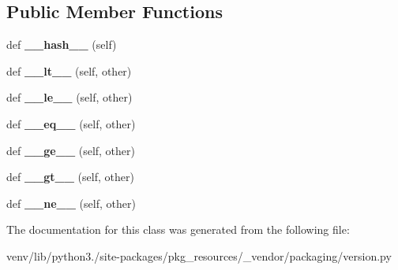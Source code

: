 \subsection*{Public Member Functions}
\begin{DoxyCompactItemize}
\item 
\mbox{\label{classpkg__resources_1_1__vendor_1_1packaging_1_1version_1_1___base_version_a12e90ca37b8bdb6cb0e76418fe1cd2d5}} 
def {\bfseries \+\_\+\+\_\+hash\+\_\+\+\_\+} (self)
\item 
\mbox{\label{classpkg__resources_1_1__vendor_1_1packaging_1_1version_1_1___base_version_a9de5dc61282a0ebcdebfb51f21db3a67}} 
def {\bfseries \+\_\+\+\_\+lt\+\_\+\+\_\+} (self, other)
\item 
\mbox{\label{classpkg__resources_1_1__vendor_1_1packaging_1_1version_1_1___base_version_a33fd377a1abd86fe7b248798542b7bbe}} 
def {\bfseries \+\_\+\+\_\+le\+\_\+\+\_\+} (self, other)
\item 
\mbox{\label{classpkg__resources_1_1__vendor_1_1packaging_1_1version_1_1___base_version_aa7df680623586d3963b9ea276e73a6e2}} 
def {\bfseries \+\_\+\+\_\+eq\+\_\+\+\_\+} (self, other)
\item 
\mbox{\label{classpkg__resources_1_1__vendor_1_1packaging_1_1version_1_1___base_version_ab70e84262e778d55f03e0faca98d37ba}} 
def {\bfseries \+\_\+\+\_\+ge\+\_\+\+\_\+} (self, other)
\item 
\mbox{\label{classpkg__resources_1_1__vendor_1_1packaging_1_1version_1_1___base_version_a90615e99a9d83c8434923bfe763d598c}} 
def {\bfseries \+\_\+\+\_\+gt\+\_\+\+\_\+} (self, other)
\item 
\mbox{\label{classpkg__resources_1_1__vendor_1_1packaging_1_1version_1_1___base_version_a13ddf24975b4e331cdbfbd7fd9513496}} 
def {\bfseries \+\_\+\+\_\+ne\+\_\+\+\_\+} (self, other)
\end{DoxyCompactItemize}


The documentation for this class was generated from the following file\+:\begin{DoxyCompactItemize}
\item 
venv/lib/python3./site-\/packages/pkg\+\_\+resources/\+\_\+vendor/packaging/version.\+py\end{DoxyCompactItemize}
